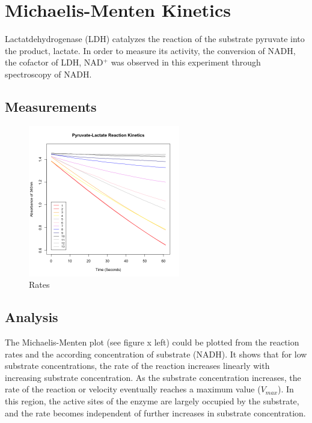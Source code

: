 \documentclass[a4paper,11pt]{article}
\begin{document}
    \section{Michaelis-Menten Kinetics}
        Lactatdehydrogenase (LDH) catalyzes the reaction of the substrate pyruvate into the product, 
        lactate. In order to measure its activity, the conversion of NADH, the cofactor of LDH, NAD$^+$ 
        was observed in this experiment through spectroscopy of NADH.
        
        \subsection*{Measurements}
            \begin{figure}[H]
                \centering
                \includegraphics[width=250px]{../resources/kinetics_rates.png}
                \caption{Rates}\label{fig:mm_rates}
            \end{figure}
            
            \subsection*{Analysis}
                The Michaelis-Menten plot (see figure x left) could be plotted from the reaction rates 
                and the according concentration of substrate (NADH). It shows that for low substrate 
                concentrations, the rate of the reaction increases linearly with increasing substrate 
                concentration. As the substrate concentration increases, the rate of the reaction or 
                velocity eventually reaches a maximum value ($V_{max}$). In this region, the active sites 
                of the enzyme are largely occupied by the substrate, and the rate becomes independent 
                of further increases in substrate concentration.
            
\end{document}
